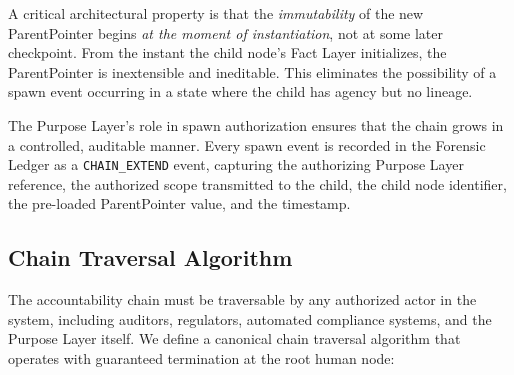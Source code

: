 A critical architectural property is that the \textit{immutability} of the new ParentPointer begins \textit{at the moment of instantiation}, not at some later checkpoint. From the instant the child node's Fact Layer initializes, the ParentPointer is inextensible and ineditable. This eliminates the possibility of a spawn event occurring in a state where the child has agency but no lineage.

The Purpose Layer's role in spawn authorization ensures that the chain grows in a controlled, auditable manner. Every spawn event is recorded in the Forensic Ledger as a \texttt{CHAIN\_EXTEND} event, capturing the authorizing Purpose Layer reference, the authorized scope transmitted to the child, the child node identifier, the pre-loaded ParentPointer value, and the timestamp.

\subsection{Chain Traversal Algorithm}

The accountability chain must be traversable by any authorized actor in the system, including auditors, regulators, automated compliance systems, and the Purpose Layer itself. We define a canonical chain traversal algorithm that operates with guaranteed termination at the root human node:

